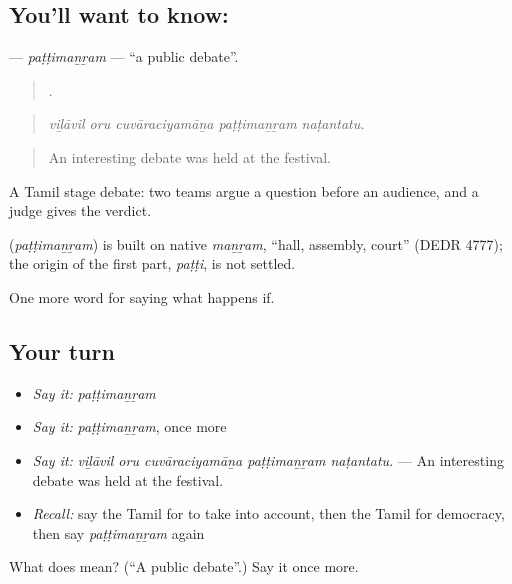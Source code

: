 \subsection*{You'll want to know: }
\textbf{} — \emph{paṭṭimaṉṟam} — \textquotedblleft{}a public debate\textquotedblright{}.

\begin{quote}
    .
\end{quote}

\begin{quote}
\emph{viḻāvil oru cuvāraciyamāṉa paṭṭimaṉṟam naṭantatu.}
\end{quote}

\begin{quote}
An interesting debate was held at the festival.
\end{quote}

A Tamil stage debate: two teams argue a question before an audience, and a judge gives the verdict.

\begin{cousinweb}
\textbf{} (\emph{paṭṭimaṉṟam}) is built on native \emph{maṉṟam}, \textquotedblleft{}hall, assembly, court\textquotedblright{} (DEDR 4777); the origin of the first part, \emph{paṭṭi}, is not settled.
\end{cousinweb}

\begin{grammarlens}[title={What you've built}]
One more word for saying what happens if.
\end{grammarlens}

\subsection*{Your turn}
\begin{itemize}
\raggedright
  \item \emph{Say it:} \emph{paṭṭimaṉṟam}
  \item \emph{Say it:} \emph{paṭṭimaṉṟam}, once more
  \item \emph{Say it:} \emph{viḻāvil oru cuvāraciyamāṉa paṭṭimaṉṟam naṭantatu.} — An interesting debate was held at the festival.
  \item \emph{Recall:} say the Tamil for to take into account, then the Tamil for democracy, then say \emph{paṭṭimaṉṟam} again
\end{itemize}

\begin{tcolorbox}[breakable,colback=teal!4,colframe=teal!35!black,title={Before you move on}]
What does  mean? (\textquotedblleft{}A public debate\textquotedblright{}.) Say it once more.
\end{tcolorbox}
